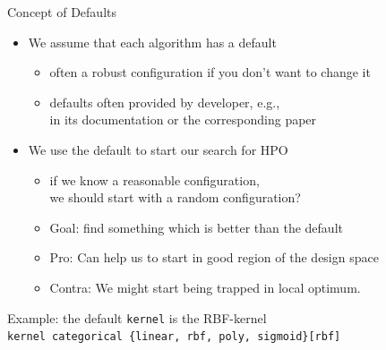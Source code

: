 \begin{frame}[c]{Concept of Defaults}

\begin{itemize}
  \item We assume that each algorithm has a default
  \begin{itemize}
    \item often a robust configuration if you don't want to change it
    \item defaults often provided by developer, e.g.,\\
   		  in its documentation or the corresponding paper
  \end{itemize}
  \pause
  \item We use the default to start our search for HPO
  \begin{itemize}
    \item if we know a reasonable configuration,\\ we should start with a random configuration?
    \item Goal: find something which is better than the default
    \pause
    \smallskip
    \item Pro: Can help us to start in good region of the design space
    \item Contra: We might start being trapped in local optimum.
  \end{itemize}
\end{itemize}

\pause
Example: the default \texttt{kernel} is the RBF-kernel\\
\texttt{kernel categorical \{linear, rbf, poly, sigmoid\}[rbf]}

\end{frame}
